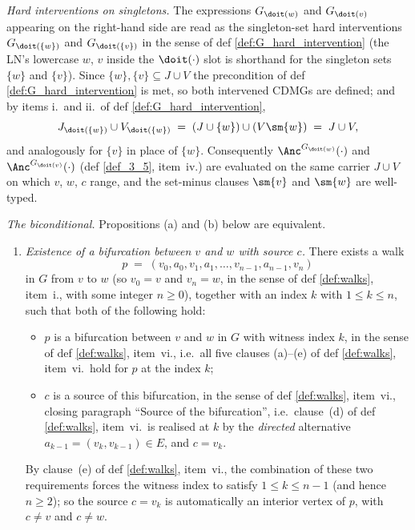{\begin{Prp}[BifurcationAlternative]
    \emph{Hard interventions on singletons.}
    The expressions $G_{\doit(w)}$ and $G_{\doit(v)}$ appearing on the
    right-hand side are read as the singleton-set hard interventions
    $G_{\doit(\{w\})}$ and $G_{\doit(\{v\})}$ in the sense of def
    \ref{def:G_hard_intervention} (the LN's lowercase $w$, $v$ inside the
    $\doit(\cdot)$ slot is shorthand for the singleton sets $\{w\}$ and
    $\{v\}$). Since $\{w\}, \{v\} \subseteq J \cup V$ the precondition of
    def \ref{def:G_hard_intervention} is met, so both intervened CDMGs
    are defined; and by items i.\ and ii.\ of def
    \ref{def:G_hard_intervention},
    \[
        J_{\doit(\{w\})} \cup V_{\doit(\{w\})}
        \;=\; (J \cup \{w\}) \cup (V \sm \{w\}) \;=\; J \cup V,
    \]
    and analogously for $\{v\}$ in place of $\{w\}$. Consequently
    $\Anc^{G_{\doit(w)}}(\cdot)$ and $\Anc^{G_{\doit(v)}}(\cdot)$ (def
    \ref{def_3_5}, item~iv.) are evaluated on the same carrier $J \cup V$
    on which $v$, $w$, $c$ range, and the set-minus clauses
    $\sm \{v\}$ and $\sm \{w\}$ are well-typed.

    \emph{The biconditional.} Propositions (a) and (b) below are
    equivalent.
    \begin{enumerate}[label=(\alph*)]
        \item \emph{Existence of a bifurcation between $v$ and $w$ with
              source $c$.}
              There exists a walk
              \[
                  p \;=\; (v_0, a_0, v_1, a_1, \dots, v_{n-1}, a_{n-1}, v_n)
              \]
              in $G$ from $v$ to $w$ (so $v_0 = v$ and $v_n = w$, in the
              sense of def \ref{def:walks}, item~i., with some integer
              $n \ge 0$), together with an index $k$ with
              $1 \le k \le n$, such that both of the following hold:
              \begin{itemize}
                  \item $p$ is a bifurcation between $v$ and $w$ in $G$
                        with witness index $k$, in the sense of def
                        \ref{def:walks}, item~vi., i.e.\ all five
                        clauses (a)--(e) of def \ref{def:walks},
                        item~vi.\ hold for $p$ at the index $k$;
                  \item $c$ is a source of this bifurcation, in the sense
                        of def \ref{def:walks}, item~vi., closing
                        paragraph ``Source of the bifurcation'', i.e.\
                        clause~(d) of def \ref{def:walks}, item~vi.\ is
                        realised at $k$ by the \emph{directed}
                        alternative $a_{k-1} = (v_k, v_{k-1}) \in E$,
                        and $c = v_k$.
              \end{itemize}
              By clause~(e) of def \ref{def:walks}, item~vi., the
              combination of these two requirements forces the witness
              index to satisfy $1 \le k \le n - 1$ (and hence $n \ge 2$);
              so the source $c = v_k$ is automatically an interior vertex
              of $p$, with $c \ne v$ and $c \ne w$.


\end{enumerate}
\end{Prp}}
